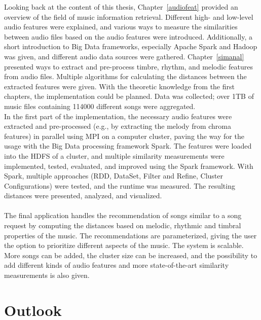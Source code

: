 Looking back at the content of this thesis, Chapter~\ref{audiofeat} provided an overview of the field of music information retrieval. Different high- and low-level audio features were explained, and various ways to measure the similarities between audio files based on the audio features were introduced. Additionally, a short introduction to Big Data frameworks, especially Apache Spark and Hadoop was given, and different audio data sources were gathered. Chapter~\ref{simanal} presented ways to extract and pre-process timbre, rhythm, and melodic features from audio files. Multiple algorithms for calculating the distances between the extracted features were given. With the theoretic knowledge from the first chapters, the implementation could be planned. Data was collected; over 1TB of music files containing 114000 different songs were aggregated.\\ 
In the first part of the implementation, the necessary audio features were extracted and pre-processed (e.g., by extracting the melody from chroma features) in parallel using MPI on a computer cluster, paving the way for the usage with the Big Data processing framework Spark.
The features were loaded into the HDFS of a cluster, and multiple similarity measurements were implemented, tested, evaluated, and improved using the Spark framework. With Spark, multiple approaches (RDD, DataSet, Filter and Refine, Cluster Configurations) were tested, and the runtime was measured. The resulting distances were presented, analyzed, and visualized.\\
\ \\
The final application handles the recommendation of songs similar to a song request by computing the distances based on melodic, rhythmic and timbral properties of the music. The recommendations are parameterized, giving the user the option to prioritize different aspects of the music. The system is scalable. More songs can be added, the cluster size can be increased, and the possibility to add different kinds of audio features and more state-of-the-art similarity measurements is also given. 

\section{Outlook}

